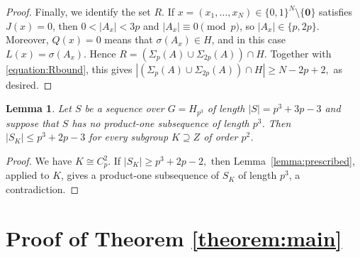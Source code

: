 \documentclass[a4paper, 12pt]{article}
\newtheorem{lemma}[theorem]{Lemma}
\theoremstyle{definition}
\begin{document}
\begin{proof}
Finally, we identify the set $R$.  If
$x=(x_1,\ldots,x_N)\in\{0,1\}^N\setminus\{\mathbf 0\}$ satisfies $J(x)=0$, then
$0<|A_x|<3p$ and $|A_x|\equiv0\pmod p$, so
$|A_x|\in\{p,2p\}$. Moreover, $Q(x)=0$ means that
$\sigma(A_x)\in H$, and in this case
$L(x)=\sigma(A_x)$. Hence $R=
\left(\Sigma_p(A)\cup\Sigma_{2p}(A)\right)\cap H.$
Together with \eqref{equation:Rbound}, this gives $\left|
\left(\Sigma_p(A)\cup\Sigma_{2p}(A)\right)\cap H
\right|
\ge N-2p+2,$
as desired.
\end{proof}



\begin{lemma}\label{lemma:upperlength}
Let $S$ be a sequence over $G=H_{p^3}$ of length
$|S|=p^3+3p-3$
and suppose that $S$ has no product-one subsequence of length $p^3$.
Then
$|S_K|\le p^3+2p-3$
for every subgroup $K\supseteq Z$ of order $p^2$.
\end{lemma}

\begin{proof}
We have $K\cong C_p^2$. If
$|S_K|\ge p^3+2p-2,$
then Lemma~\ref{lemma:prescribed}, applied to $K$, gives a product-one
subsequence of $S_K$ of length $p^3$, a contradiction.
\end{proof}


\section{Proof of Theorem \ref{theorem:main}}
\end{document}
